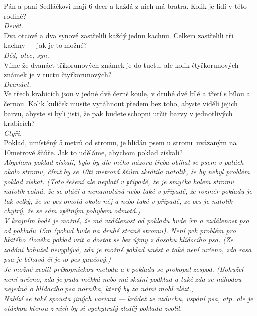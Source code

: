 \begin{multicols}{\value{columnsgames}}
\noindent
Pán a paní Sedláčkovi mají 6 dcer a každá z nich má bratra. 
Kolik je lidí v této rodině?\\[1 mm]
{\sl Devět.}\\

\noindent
Dva otcové a dva synové zastřelili každý jednu kachnu. Celkem 
zastřelili tři kachny --- jak je to možné?\\[1 mm]
{\sl Děd, otec, syn.}\\

\noindent
Víme že dvanáct tříkorunových známek je do tuctu, ale kolik 
čtyřkorunových známek je v tuctu čtyřkorunových?\\[1 mm]
{\sl Dvanáct.}\\

\noindent
Ve třech krabicích jsou v jedné dvě černé koule, v druhé 
dvě bílé a třetí s bílou a černou. Kolik kuliček musíte vytáhnout 
předem bez toho, abyste viděli jejich barvu, abyste si byli jisti, 
že pak budete schopni určit barvy v jednotlivých krabicích?\\[1 mm]
{\sl Čtyři.}\\

\noindent
Poklad, umístěný 5 metrů od stromu, je hlídán psem u stromu 
uvázaným na 10metrové šňůře. Jak to uděláme, abychom poklad
získali?\\[1 mm]
{\sl Abychom poklad získali, bylo by dle mého názoru třeba obíhat 
se psem v patách okolo stromu, čímž by se 10ti metrová šňůra zkrátila 
natolik, že by nebyl problém poklad získat. (Toto řešení ale 
neplatí v případě, že je smyčka kolem stromu natolik volná, že 
se otáčí a nenamotává nebo také v případě, že rozměr pokladu 
je tak velký, že se pes omotá okolo něj a nebo také v případě, 
ze pes je natolik chytrý, že se sám zpětným pohybem odmotá.)\\[1 mm]
V krajním bodě je možné, že má vzdálenost od pokladu bude 
5m a vzdálenost psa od pokladu 15m (pokud bude na druhé straně 
stromu). Není pak problém pro hbitého člověka poklad vzít a dostat 
se bez újmy z dosahu hlídacího psa. (Ze zadání bohužel nevyplývá, 
zda je možné poklad unést a také není určeno, zda rasa psa je 
běhavá či je to pes gaučový.)\\[1 mm]
Je možné zvolit průkopnickou metodu a k pokladu se prokopat 
zespod. (Bohužel není určeno, zda je půda měkká nebo má skalní 
podklad a také zda se náhodou nejedná o hlídacího psa norníka, 
který by za námi mohl vlézt.)\\[1 mm]
Nabízí se také spousta jiných variant --- krádež ze vzduchu, 
uspání psa, atp. ale je otázkou kterou z nich by si vychytralý
zloděj pokladu zvolil.}\\


\end{multicols}

